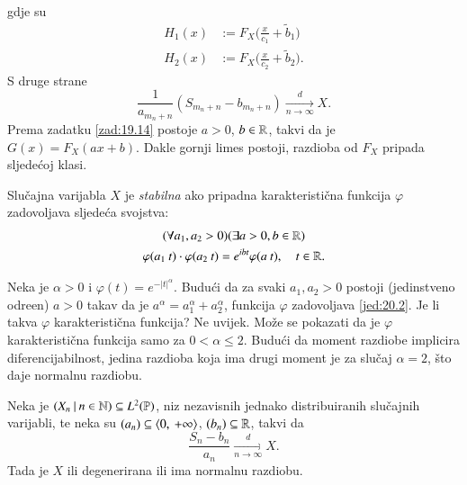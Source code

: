 gdje su
\begin{equation*}
    \begin{aligned}
        H_1 (x) &:= F_X \Big( \frac{x}{c_1} + \widetilde{b}_1 \Big)\\
        H_2 (x) &:= F_X \Big( \frac{x}{c_2} + \widetilde{b}_2 \Big).
    \end{aligned}
\end{equation*}
S druge strane
\begin{equation*}
    \frac{1}{a_{m_n + n}} (S_{m_n + n} - b_{m_n + n}) \xrightarrow[n \to \infty]{d} X.
\end{equation*}
Prema zadatku \ref{zad:19.14} postoje $a > 0$, $b \in \mathbb{R}$, takvi da je $G(x) = F_X (ax + b)$.
Dakle gornji limes postoji, razdioba od $F_X$ pripada sljede\' coj klasi.

\begin{defn}    \label{defn:20.1}
    Slu\v cajna varijabla $X$ je \emph{stabilna} ako pripadna karakteristi\v cna funkcija $\varphi$ zadovoljava sljede\' ca svojstva:
    \begin{equation}    \label{jed:20.2}
        \begin{gathered}
            (\forall a_1, a_2 > 0) (\exists a > 0, b \in \mathbb{R})\\
            \varphi (a_1 \: t) \cdot \varphi (a_2 \: t) = e^{i b t} \varphi (a \: t), \quad t \in \mathbb{R}.
        \end{gathered} 
    \end{equation}
\end{defn}

\begin{pr}  \label{pr:20.3}
    Neka je $\alpha > 0$ i $\varphi (t) = e^{-|t|^\alpha}$.
    Budu\' ci da za svaki $a_1, a_2 > 0$ postoji (jedinstveno odre\dj en) $a > 0$ takav da je $a^\alpha = a_1^\alpha + a_2^\alpha$, funkcija $\varphi$ zadovoljava \eqref{jed:20.2}.
    Je li takva $\varphi$ karakteristi\v cna funkcija?
    Ne uvijek.
    Mo\v ze se pokazati da je $\varphi$ karakteristi\v cna funkcija samo za $0< \alpha \leq 2$.
    Budu\' ci da moment razdiobe implicira diferencijabilnost, jedina razdioba koja ima drugi moment je za slu\v caj $\alpha = 2$, \v sto daje normalnu razdiobu. 
\end{pr}

\begin{zad}[*]  \label{zad:20.4}
    Neka je $({X_n} \: | \: {n \in \mathbb{N}}) \subseteq L^2 (\mathbb{P})$, niz nezavisnih jednako distribuiranih slu\v cajnih varijabli, te neka su $(a_n) \subseteq \langle {0}, \: {+\infty} \rangle$, $(b_n) \subseteq \mathbb{R}$, takvi da
    \begin{equation*}
        \frac{S_n - b_n}{a_n} \xrightarrow[n \to \infty]{d} X.
    \end{equation*}
    Tada je $X$ ili degenerirana ili ima normalnu razdiobu.
\end{zad}

